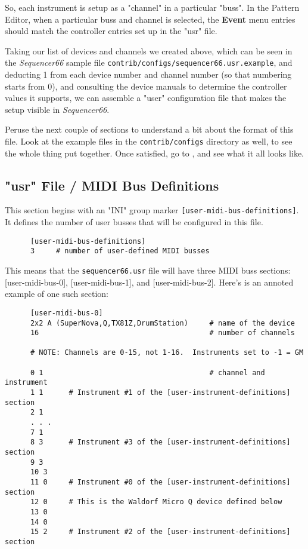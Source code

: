    So, each instrument is setup as a "channel" in a particular "buss".
   In the Pattern Editor, when a particular buss and channel is selected,
   the \textbf{Event} menu entries should match the controller entries set up
   in the "usr" file.

   Taking our list of devices and channels we created above, which
   can be seen in the \textsl{Sequencer66} sample file
   \texttt{contrib/configs/sequencer66.usr.example}, and 
   deducting 1 from each device number and channel number (so that numbering
   starts from 0), and consulting the device manuals to determine the
   controller values it supports, we can assemble a "user" configuration file
   that makes the setup visible in \textsl{Sequencer66}.

   Peruse the next couple of sections to understand a bit about the format of
   this file.  Look at the example files in the \texttt{contrib/configs}
   directory as well, to see the whole thing put together.
   Once satisfied, go to
   , and 
   see what it all looks like.

\subsection{"usr" File / MIDI Bus Definitions}
\label{subsec:seq66_usr_file_midi_bus_definitions}

   This section begins with an
   "INI" group marker \texttt{[user-midi-bus-definitions]}.
   It defines the number of user busses that will be configured in this file.

   \begin{verbatim}
      [user-midi-bus-definitions]
      3     # number of user-defined MIDI busses
   \end{verbatim}

   This means that the \texttt{sequencer66.usr} file will have three MIDI buss
   sections: [user-midi-bus-0], [user-midi-bus-1], and [user-midi-bus-2].
   Here's is an annoted example of one such section:

   \begin{verbatim}
      [user-midi-bus-0]
      2x2 A (SuperNova,Q,TX81Z,DrumStation)     # name of the device
      16                                        # number of channels

      # NOTE: Channels are 0-15, not 1-16.  Instruments set to -1 = GM

      0 1                                       # channel and instrument
      1 1      # Instrument #1 of the [user-instrument-definitions] section
      2 1
      . . .
      7 1
      8 3      # Instrument #3 of the [user-instrument-definitions] section
      9 3
      10 3
      11 0     # Instrument #0 of the [user-instrument-definitions] section
      12 0     # This is the Waldorf Micro Q device defined below
      13 0
      14 0
      15 2     # Instrument #2 of the [user-instrument-definitions] section
   \end{verbatim}

